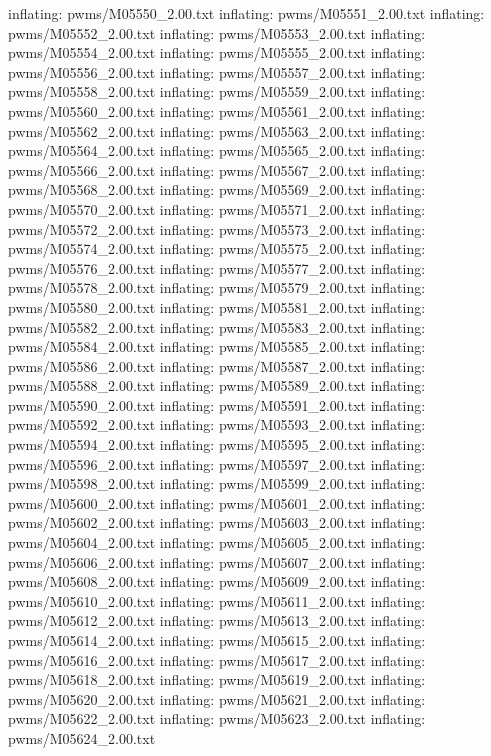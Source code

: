 \documentclass[letterpaper,10pt,english]{sphinxmanual}
\begin{document}
{\begin{sphinxVerbatim}[commandchars=\\\{\}]
  inflating: pwms/M05550\_2.00.txt
  inflating: pwms/M05551\_2.00.txt
  inflating: pwms/M05552\_2.00.txt
  inflating: pwms/M05553\_2.00.txt
  inflating: pwms/M05554\_2.00.txt
  inflating: pwms/M05555\_2.00.txt
  inflating: pwms/M05556\_2.00.txt
  inflating: pwms/M05557\_2.00.txt
  inflating: pwms/M05558\_2.00.txt
  inflating: pwms/M05559\_2.00.txt
  inflating: pwms/M05560\_2.00.txt
  inflating: pwms/M05561\_2.00.txt
  inflating: pwms/M05562\_2.00.txt
  inflating: pwms/M05563\_2.00.txt
  inflating: pwms/M05564\_2.00.txt
  inflating: pwms/M05565\_2.00.txt
  inflating: pwms/M05566\_2.00.txt
  inflating: pwms/M05567\_2.00.txt
  inflating: pwms/M05568\_2.00.txt
  inflating: pwms/M05569\_2.00.txt
  inflating: pwms/M05570\_2.00.txt
  inflating: pwms/M05571\_2.00.txt
  inflating: pwms/M05572\_2.00.txt
  inflating: pwms/M05573\_2.00.txt
  inflating: pwms/M05574\_2.00.txt
  inflating: pwms/M05575\_2.00.txt
  inflating: pwms/M05576\_2.00.txt
  inflating: pwms/M05577\_2.00.txt
  inflating: pwms/M05578\_2.00.txt
  inflating: pwms/M05579\_2.00.txt
  inflating: pwms/M05580\_2.00.txt
  inflating: pwms/M05581\_2.00.txt
  inflating: pwms/M05582\_2.00.txt
  inflating: pwms/M05583\_2.00.txt
  inflating: pwms/M05584\_2.00.txt
  inflating: pwms/M05585\_2.00.txt
  inflating: pwms/M05586\_2.00.txt
  inflating: pwms/M05587\_2.00.txt
  inflating: pwms/M05588\_2.00.txt
  inflating: pwms/M05589\_2.00.txt
  inflating: pwms/M05590\_2.00.txt
  inflating: pwms/M05591\_2.00.txt
  inflating: pwms/M05592\_2.00.txt
  inflating: pwms/M05593\_2.00.txt
  inflating: pwms/M05594\_2.00.txt
  inflating: pwms/M05595\_2.00.txt
  inflating: pwms/M05596\_2.00.txt
  inflating: pwms/M05597\_2.00.txt
  inflating: pwms/M05598\_2.00.txt
  inflating: pwms/M05599\_2.00.txt
  inflating: pwms/M05600\_2.00.txt
  inflating: pwms/M05601\_2.00.txt
  inflating: pwms/M05602\_2.00.txt
  inflating: pwms/M05603\_2.00.txt
  inflating: pwms/M05604\_2.00.txt
  inflating: pwms/M05605\_2.00.txt
  inflating: pwms/M05606\_2.00.txt
  inflating: pwms/M05607\_2.00.txt
  inflating: pwms/M05608\_2.00.txt
  inflating: pwms/M05609\_2.00.txt
  inflating: pwms/M05610\_2.00.txt
  inflating: pwms/M05611\_2.00.txt
  inflating: pwms/M05612\_2.00.txt
  inflating: pwms/M05613\_2.00.txt
  inflating: pwms/M05614\_2.00.txt
  inflating: pwms/M05615\_2.00.txt
  inflating: pwms/M05616\_2.00.txt
  inflating: pwms/M05617\_2.00.txt
  inflating: pwms/M05618\_2.00.txt
  inflating: pwms/M05619\_2.00.txt
  inflating: pwms/M05620\_2.00.txt
  inflating: pwms/M05621\_2.00.txt
  inflating: pwms/M05622\_2.00.txt
  inflating: pwms/M05623\_2.00.txt
  inflating: pwms/M05624\_2.00.txt

\end{sphinxVerbatim}}
\end{document}
